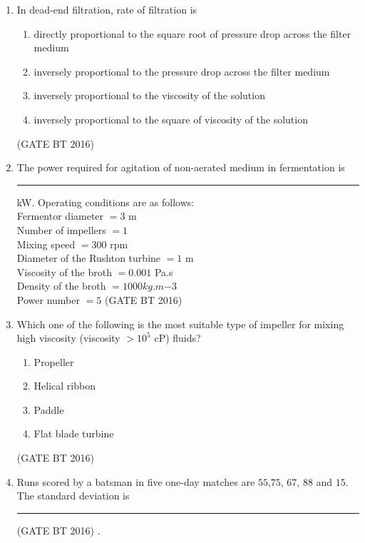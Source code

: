\documentclass[journal,12pt,onecolumn]{IEEEtran}
\theoremstyle{remark}
\begin{document}
\begin{enumerate}
\item In dead-end filtration, rate of filtration is
\begin{multicols}{2}
\begin{enumerate}
\item directly proportional to the square root of pressure drop across the filter medium
\item  inversely proportional to the pressure drop across the filter medium
\item inversely proportional to the viscosity of the solution
\item  inversely proportional to the square of viscosity of the solution

\end{enumerate}
\end{multicols} \hfill(GATE BT 2016)  

\item The power required for agitation of non-aerated medium in fermentation is\rule{2cm}{0.4pt} kW. Operating conditions are as follows:\\

Fermentor diameter $= 3$ m\\ Number of impellers $= 1$ \\Mixing speed $= 300$ rpm\\
Diameter of the Rushton turbine $= 1$ m \\Viscosity of the broth $= 0.001$ Pa.s \\Density of the broth $= 1000 kg.m{-3}$\\ Power number $= 5$  \hfill(GATE BT 2016)  

\item Which one of the following is the most suitable type of impeller for mixing high viscosity (viscosity $> 10^{5}$ cP) fluids?
\begin{multicols}{4}
\begin{enumerate}
\item  Propeller	
\item  Helical ribbon	
\item  Paddle 
\item  Flat blade turbine
\end{enumerate}
\end{multicols} \hfill(GATE BT 2016)   

\item  Runs scored by a batsman in five one-day matches are $55$,$ 75$, $67$, $88$ and $15$. The standard deviation is \rule{2cm }{0.4pt}  \hfill(GATE BT 2016) 	.


\end{enumerate}
\end{document}
